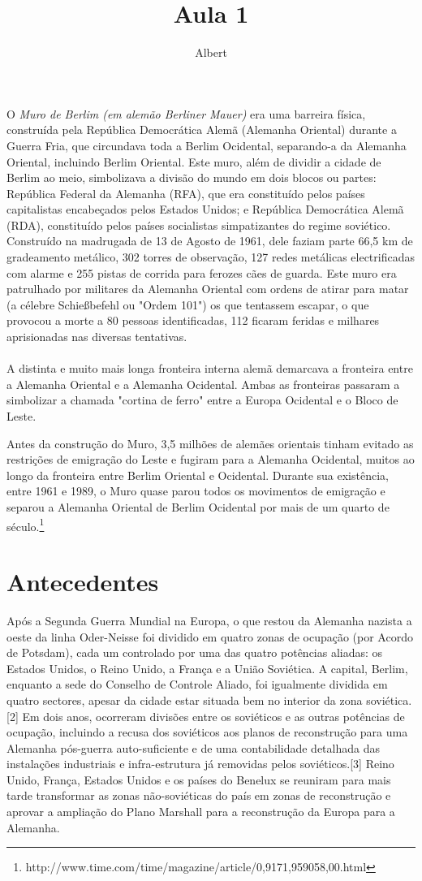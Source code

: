 \documentclass[a4paper]{article}
\author{Albert}
\title{Aula 1}
\begin{document}
\maketitle
O \emph{Muro de Berlim (em alemão Berliner Mauer)} era uma barreira física, construída pela República Democrática Alemã (Alemanha Oriental) durante a Guerra Fria, que circundava toda a Berlim Ocidental, separando-a da Alemanha Oriental, incluindo Berlim Oriental. Este muro, além de dividir a cidade de Berlim ao meio, simbolizava a divisão do mundo em dois blocos ou partes: República Federal da Alemanha (RFA), que era constituído pelos países capitalistas encabeçados pelos Estados Unidos; e República Democrática Alemã (RDA), constituído pelos países socialistas simpatizantes do regime soviético. Construído na madrugada de 13 de Agosto de 1961, dele faziam parte 66,5 km de gradeamento metálico, 302 torres de observação, 127 redes metálicas electrificadas com alarme e 255 pistas de corrida para ferozes cães de guarda. Este muro era patrulhado por militares da Alemanha Oriental com ordens de atirar para matar (a célebre Schießbefehl ou "Ordem 101") os que tentassem escapar, o que provocou a morte a 80 pessoas identificadas, 112 ficaram feridas e milhares aprisionadas nas diversas tentativas.\\ \\
A distinta e muito mais longa fronteira interna alemã demarcava a fronteira entre a Alemanha Oriental e a Alemanha Ocidental. Ambas as fronteiras passaram a simbolizar a chamada "cortina de ferro" entre a Europa Ocidental e o Bloco de Leste.

Antes da construção do Muro, 3,5 milhões de alemães orientais tinham evitado as restrições de emigração do Leste e fugiram para a Alemanha Ocidental, muitos ao longo da fronteira entre Berlim Oriental e Ocidental. Durante sua existência, entre 1961 e 1989, o Muro quase parou todos os movimentos de emigração e separou a Alemanha Oriental de Berlim Ocidental por mais de um quarto de século.\footnote{http://www.time.com/time/magazine/article/0,9171,959058,00.html}

\section*{Antecedentes}
Após a Segunda Guerra Mundial na Europa, o que restou da Alemanha nazista a oeste da linha Oder-Neisse foi dividido em quatro zonas de ocupação (por Acordo de Potsdam), cada um controlado por uma das quatro potências aliadas: os Estados Unidos, o Reino Unido, a França e a União Soviética. A capital, Berlim, enquanto a sede do Conselho de Controle Aliado, foi igualmente dividida em quatro sectores, apesar da cidade estar situada bem no interior da zona soviética.[2] Em dois anos, ocorreram divisões entre os soviéticos e as outras potências de ocupação, incluindo a recusa dos soviéticos aos planos de reconstrução para uma Alemanha pós-guerra auto-suficiente e de uma contabilidade detalhada das instalações industriais e infra-estrutura já removidas pelos soviéticos.[3] Reino Unido, França, Estados Unidos e os países do Benelux se reuniram para mais tarde transformar as zonas não-soviéticas do país em zonas de reconstrução e aprovar a ampliação do Plano Marshall para a reconstrução da Europa para a Alemanha.
\end{document}
